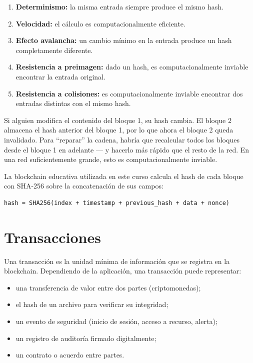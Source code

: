 \documentclass[
  coursetitle={Cómputo Nube y Tecnologías Emergentes},
  coursehours={96},
  coursedate={Verano 2026},
  doctype={Notas de clase},
  otherlangs={english,french},
  authorname={Lázaro},
  authorsurname={Bustio-Martínez},
  authortitle={PhD},
  role={Profesor Investigador},
  email={lbustio@inaoe.mx},
  phone={5559504000},
  ext={7459},
  institution={Instituto Nacional de Astrofísica, Óptica y Electrónica (INAOE)},
  department={Maestría en Ciencias en Tecnologías de Seguridad},
  address={Luis Enrique Erro 1, Sta. Ma. Tonantzintla, San Andrés Cholula, CP 72840, Puebla, México},
  margin={0.5in}
]{../../lbustio_lecture_notes}
\begin{document}
\begin{enumerate}
  \item \textbf{Determinismo:} la misma entrada siempre produce el mismo hash.
  \item \textbf{Velocidad:} el cálculo es computacionalmente eficiente.
  \item \textbf{Efecto avalancha:} un cambio mínimo en la entrada produce un hash completamente diferente.
  \item \textbf{Resistencia a preimagen:} dado un hash, es computacionalmente inviable encontrar la entrada original.
  \item \textbf{Resistencia a colisiones:} es computacionalmente inviable encontrar dos entradas distintas con el mismo hash.
\end{enumerate}

\begin{tcolorbox}[title=Por qué el hash garantiza la integridad]
Si alguien modifica el contenido del bloque 1, su hash cambia. El bloque 2 almacena el hash anterior del bloque 1, por lo que ahora el bloque 2 queda invalidado. Para ``reparar'' la cadena, habría que recalcular todos los bloques desde el bloque 1 en adelante --- y hacerlo más rápido que el resto de la red. En una red suficientemente grande, esto es computacionalmente inviable.
\end{tcolorbox}

La blockchain educativa utilizada en este curso calcula el hash de cada bloque con SHA-256 sobre la concatenación de sus campos:

\begin{lstlisting}
hash = SHA256(index + timestamp + previous_hash + data + nonce)
\end{lstlisting}

\section{Transacciones}

Una transacción es la unidad mínima de información que se registra en la blockchain. Dependiendo de la aplicación, una transacción puede representar:

\begin{itemize}
  \item una transferencia de valor entre dos partes (criptomonedas);
  \item el hash de un archivo para verificar su integridad;
  \item un evento de seguridad (inicio de sesión, acceso a recurso, alerta);
  \item un registro de auditoría firmado digitalmente;
  \item un contrato o acuerdo entre partes.
\end{itemize}
\end{document}
